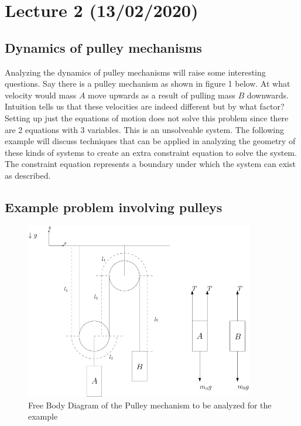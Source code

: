 \documentclass[11pt, a4paper]{article}
\begin{document}
\setcounter{section}{1}
\section{Lecture 2 (13/02/2020)}

\subsection{Dynamics of pulley mechanisms}
Analyzing the dynamics of pulley mechanisms will raise some interesting questions.
Say there is a pulley mechanism as shown in figure 1 below. At what velocity would mass $A$
move upwards as a result of pulling mass $B$ downwards. Intuition tells us that these velocities
are indeed different but by what factor? Setting up just the equations of motion does not solve this problem
since there are 2 equations with 3 variables. This is an unsolveable system. 
The following example will discuss techniques that can be applied in analyzing the geometry of these kinds of systems
to create an extra constraint equation to solve the system. The constraint equation represents a
boundary under which the system can exist as described.


\subsection{Example problem involving pulleys}
\begin{figure}[h]
    \centerline{\includegraphics[width=10cm]{images/Pulleys.png}}
    \caption{Free Body Diagram of the Pulley mechanism to be analyzed for the example}
\end{figure}
\end{document}
